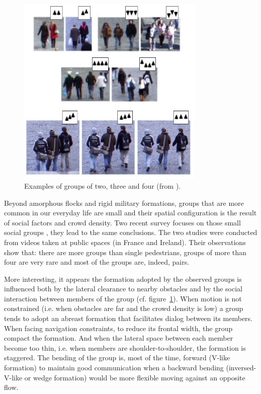 \documentclass{article}
\begin{document}
\begin{figure}[htb]
\centering
\includegraphics[width=0.8\textwidth]{SocialGroups.jpg}
\caption{Examples of groups of two, three and four (from \cite{Peters:2009kx}).}
\label{fig:social_groups}
\end{figure}

Beyond amorphous flocks and rigid military formations, groups that are more common in our everyday life are small and their spatial configuration is the result of social factors and crowd density. Two recent survey focuses on those small social groups \cite{Peters:2009kx,Moussaid:2010ib}, they lead to the same conclusions.
The two studies were conducted from videos taken at public spaces (in France and Ireland). Their observations show that: there are more groups than single pedestrians, groups of more than four are very rare and most of the groups are, indeed, pairs.

More interesting, it appears the formation adopted by the observed groups is influenced both by the lateral clearance to nearby obstacles and by the social interaction between members of the group (cf. figure~\ref{fig:social_groups}). When motion is not constrained (i.e. when obstacles are far and the crowd density is low) a group tends to adopt an abreast formation that facilitates dialog between its members. When facing navigation constraints, to reduce its frontal width, the group compact the formation. And when the lateral space between each member become too thin, i.e. when members are shoulder-to-shoulder, the formation is staggered. The bending of the group is, most of the time, forward (V-like formation) to maintain good communication when a backward bending (inversed-V-like or wedge formation) would be more flexible moving against an opposite flow.
\end{document}
